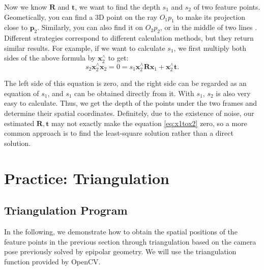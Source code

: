 Now we know $\mathbf{R}$ and $\mathbf{t}$, we want to find the depth $s_1$ and $s_2$ of two feature points. Geometically, you can find a 3D point on the ray $O_1 p_1$ to make its projection close to $\mathbf{p}_2$. Similarly, you can also find it on $O_2 p_2$, or in the middle of two lines . Different strategies correspond to different calculation methods, but they return similar results. For example, if we want to calculate $s_1$, we first multiply both sides of the above formula by $\mathbf{x}_2^\wedge$ to get:
\begin{equation}
\label{eq:x1tox2}
s_2 \mathbf{x}_2^\wedge \mathbf{x}_2 = 0 = s_1 \mathbf{x}_2^\wedge \mathbf{R} \mathbf{x}_1 + \mathbf{x}_2^\wedge \mathbf{t}. 
\end{equation}

The left side of this equation is zero, and the right side can be regarded as an equation of $s_1$, and $s_1$ can be obtained directly from it. With $s_1$, $s_2$ is also very easy to calculate. Thus, we get the depth of the points under the two frames and determine their spatial coordinates. Definitely, due to the existence of noise, our estimated $\mathbf{R}, \mathbf{t}$ may not exactly make the equation \eqref{eq:x1tox2} zero, so a more common approach is to find the least-square solution rather than a direct solution.

\section{Practice: Triangulation}
\subsection{Triangulation Program}
In the following, we demonstrate how to obtain the spatial positions of the feature points in the previous section through triangulation based on the camera pose previously solved by epipolar geometry. We will use the triangulation function provided by OpenCV.


